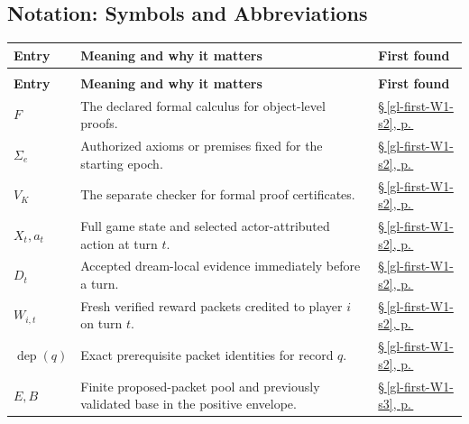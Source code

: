 \documentclass[11pt,letterpaper]{article}
\begin{document}
\subsection*{Notation: Symbols and Abbreviations}
\begingroup\small\setlength{\tabcolsep}{4pt}\renewcommand{\arraystretch}{1.16}
\begin{longtable}{@{}>{\raggedright\arraybackslash}p{.215\linewidth}>{\raggedright\arraybackslash}p{.585\linewidth}>{\raggedright\arraybackslash}p{.14\linewidth}@{}}
\toprule
\textbf{Entry} & \textbf{Meaning and why it matters} & \textbf{First found} \\
\midrule\endfirsthead
\multicolumn{3}{@{}l}{\footnotesize \emph{Notation: Symbols and Abbreviations (continued)}}\\
\toprule\textbf{Entry} & \textbf{Meaning and why it matters} & \textbf{First found} \\
\midrule\endhead
\bottomrule\endfoot
\textbf{$F$} & The declared formal calculus for object-level proofs. & \hyperref[gl-first-W1-s2]{\S\,\ref*{gl-first-W1-s2}, p.\,\pageref*{gl-first-W1-s2}} \\
\textbf{$\Sigma_e$} & Authorized axioms or premises fixed for the starting epoch. & \hyperref[gl-first-W1-s2]{\S\,\ref*{gl-first-W1-s2}, p.\,\pageref*{gl-first-W1-s2}} \\
\textbf{$V_K$} & The separate checker for formal proof certificates. & \hyperref[gl-first-W1-s2]{\S\,\ref*{gl-first-W1-s2}, p.\,\pageref*{gl-first-W1-s2}} \\
\textbf{$X_t,a_t$} & Full game state and selected actor-attributed action at turn $t$. & \hyperref[gl-first-W1-s2]{\S\,\ref*{gl-first-W1-s2}, p.\,\pageref*{gl-first-W1-s2}} \\
\textbf{$D_t$} & Accepted dream-local evidence immediately before a turn. & \hyperref[gl-first-W1-s2]{\S\,\ref*{gl-first-W1-s2}, p.\,\pageref*{gl-first-W1-s2}} \\
\textbf{$W_{i,t}$} & Fresh verified reward packets credited to player $i$ on turn $t$. & \hyperref[gl-first-W1-s2]{\S\,\ref*{gl-first-W1-s2}, p.\,\pageref*{gl-first-W1-s2}} \\
\textbf{$\operatorname{dep}(q)$} & Exact prerequisite packet identities for record $q$. & \hyperref[gl-first-W1-s2]{\S\,\ref*{gl-first-W1-s2}, p.\,\pageref*{gl-first-W1-s2}} \\
\textbf{$E,B$} & Finite proposed-packet pool and previously validated base in the positive envelope. & \hyperref[gl-first-W1-s3]{\S\,\ref*{gl-first-W1-s3}, p.\,\pageref*{gl-first-W1-s3}} \\

\end{longtable}
\end{document}
